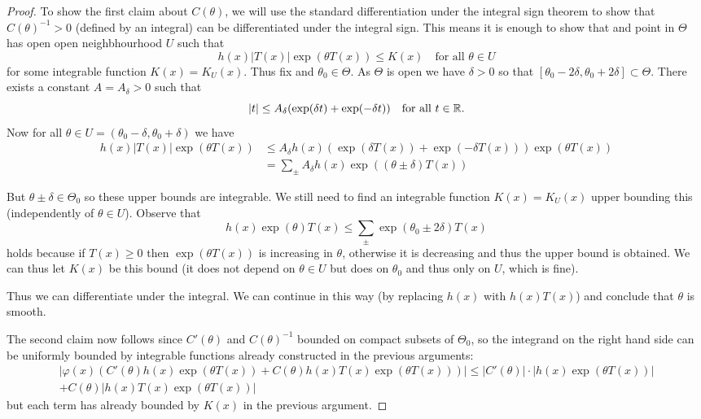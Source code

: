 \documentclass[twoside, a4paper, 10pt]{amsart}
\begin{document}
\begin{proof} To show the first claim about $C(\theta)$, we will use the standard differentiation under the integral sign theorem to show that $C(\theta)^{-1} > 0$ (defined by an integral) can be differentiated under the integral sign. This means it is enough to show that and point in $\Theta$ has open open neighbhourhood $U$ such that $$h(x)|T(x)|\exp(\theta T(x)) \leq K(x) \quad\text{for all } \theta \in U$$ for some integrable function $K(x) = K_U(x)$. Thus fix and $\theta_0 \in \Theta$. As $\Theta$ is open we have $\delta>0$ so that $[\theta_0 -2\delta, \theta_0 + 2\delta] \subset \Theta$. There exists a constant $A = A_{\delta}>0$ such that $$|t| \leq A_{\delta}(\exp(\delta t) + \exp(-\delta t)) \quad\text{for all } t \in \mathbb{R}.$$ Now for all $\theta \in U = (\theta_0 - \delta, \theta_0 + \delta)$ we have
\begin{align*}h(x)|T(x)|\exp(\theta T(x)) &\leq A_{\delta} h(x) (\exp(\delta T(x)) + \exp(-\delta T(x)) ) \exp(\theta T(x))  \\
& = \sum_{\pm} A_{\delta} h(x) \exp((\theta \pm \delta)T(x))  \end{align*}

But $\theta \pm \delta \in \Theta_0$ so these upper bounds are integrable. We still need to find an integrable function $K(x) = K_U(x)$ upper bounding this (independently of $\theta \in U$). Observe that $$h(x)\exp(\theta)T(x) \leq \sum_{\pm} \exp(\theta_0 \pm 2\delta)T(x)$$ holds because if $T(x) \geq 0$ then $\exp(\theta T(x))$ is increasing in $\theta$, otherwise it is decreasing and thus the upper bound is obtained. We can thus let $K(x)$ be this bound (it does not depend on $\theta \in U$ but does on $\theta_0$ and thus only on $U$, which is fine).

Thus we can differentiate under the integral. We can continue in this way (by replacing $h(x)$ with $h(x)T(x)$) and conclude that $\theta$ is smooth.

The second claim now follows since $C'(\theta)$ and $C(\theta)^{-1}$ bounded on compact subsets of $\Theta_0$, so the integrand on the right hand side can be uniformly bounded by integrable functions already constructed in the previous arguments:
 \begin{align*} |\varphi(x)\left(C'(\theta)h(x) \exp(\theta T(x)) + C(\theta)h(x)T(x) \exp(\theta T(x))\right)| \leq  |C'(\theta)| \cdot |h(x) \exp(\theta T(x))| \\ + C(\theta)|h(x)T(x) \exp(\theta T(x))| \end{align*}
but each term has already bounded by $K(x)$ in the previous argument. \end{proof}
\end{document}
